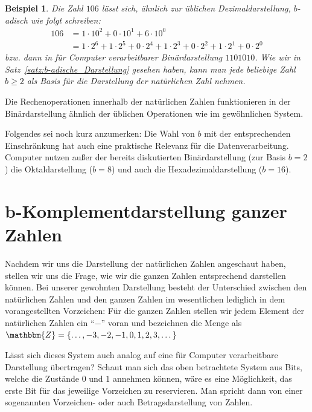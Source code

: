 \documentclass{article}
\newcommand{\Z}{\mathbbm{Z}} %
\newtheorem{beispiel}[satz]{Beispiel}
\begin{document}
  \begin{beispiel} \label{bsp:Binärdarstellung}
    Die Zahl $106$ lässt sich, ähnlich zur üblichen Dezimaldarstellung, $b$-adisch wie folgt schreiben:
    \begin{align*}
      106 &= 1 \cdot 10^2 + 0 \cdot 10^1 + 6 \cdot 10^0 \\
          &= 1 \cdot 2^6 + 1 \cdot 2^5 + 0 \cdot 2^4 + 1 \cdot 2^3 + 0 \cdot 2^2 + 1 \cdot 2^1 + 0 \cdot 2^0
    \end{align*}
    bzw. dann in für Computer verarbeitbarer Binärdarstellung $1101010$. 
    Wie wir in Satz~\ref{satz:b-adische_Darstellung} gesehen haben, kann man jede beliebige Zahl $b\geq 2$ als Basis für die Darstellung der natürlichen Zahl nehmen.
  \end{beispiel}

  \vspace{\baselineskip}

  Die Rechenoperationen innerhalb der natürlichen Zahlen funktionieren in der Binärdarstellung ähnlich der üblichen Operationen wie im gewöhnlichen System.

  \vspace{\baselineskip}

  Folgendes sei noch kurz anzumerken:
  Die Wahl von $b$ mit der entsprechenden Einschränkung hat auch eine praktische Relevanz für die Datenverarbeitung.
  Computer nutzen außer der bereits diskutierten Binärdarstellung (zur Basis $b=2$) die Oktaldarstellung ($b=8$) und auch die Hexadezimaldarstellung ($b=16$).

\newpage


\section{b-Komplementdarstellung ganzer Zahlen}

  Nachdem wir uns die Darstellung der natürlichen Zahlen angeschaut haben, stellen wir uns die Frage, wie wir die ganzen Zahlen entsprechend darstellen können.
  Bei unserer gewohnten Darstellung besteht der Unterschied zwischen den natürlichen Zahlen und den ganzen Zahlen im wesentlichen lediglich in dem vorangestellten Vorzeichen:
  Für die ganzen Zahlen stellen wir jedem Element der natürlichen Zahlen ein ``$-$'' voran und bezeichnen die Menge als $\Z = \{\dots,-3, -2, -1, 0, 1,2,3,\dots\}$

  Lässt sich dieses System auch analog auf eine für Computer verarbeitbare Darstellung übertragen?
  Schaut man sich das oben betrachtete System aus Bits, welche die Zustände $0$ und $1$ annehmen können, wäre es eine Möglichkeit, das erste Bit für das jeweilige Vorzeichen zu reservieren.
  Man spricht dann von einer sogenannten Vorzeichen- oder auch Betragsdarstellung von Zahlen.
\end{document}
